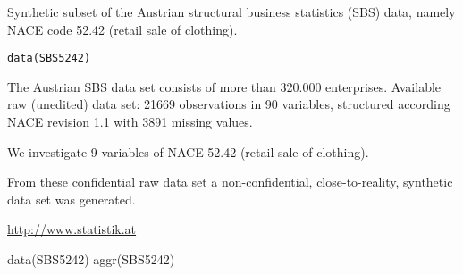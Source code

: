 %
\begin{Description}\relax
Synthetic subset of the Austrian structural business statistics (SBS) data, namely NACE code 52.42 (retail sale of clothing).
\end{Description}
%
\begin{Usage}
\begin{verbatim}
data(SBS5242)
\end{verbatim}
\end{Usage}
%
\begin{Details}\relax
The Austrian SBS data set consists of more than 320.000 enterprises. Available raw (unedited) data set:
21669 observations in 90 variables, structured
according NACE revision 1.1 with 3891 missing values.

We investigate 9 variables of NACE 52.42 (retail sale of clothing).

From these confidential raw data set a non-confidential, close-to-reality, synthetic data set was generated.
\end{Details}
%
\begin{Source}\relax
\url{http://www.statistik.at}
\end{Source}
%
\begin{Examples}
\begin{ExampleCode}
data(SBS5242)
aggr(SBS5242)
\end{ExampleCode}
\end{Examples}
